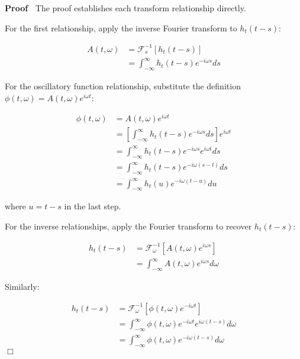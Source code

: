 \documentclass{article}
\newenvironment{proof}{\noindent\textbf{Proof\ }}{\hspace*{\fill}$\Box$\medskip}
\begin{document}
\begin{proof}
  The proof establishes each transform relationship directly.
  
  For the first relationship, apply the inverse Fourier transform to $h_t  (t
  - s)$:
  
  \begin{align}
    A (t, \omega) & =\mathcal{F}_s^{- 1}  [h_t (t - s)] \\
    & = \int_{- \infty}^{\infty} h_t  (t - s) e^{- i \omega s} ds 
  \end{align}
  
  For the oscillatory function relationship, substitute the definition $\phi
  (t, \omega) = A (t, \omega) e^{i \omega t}$:
  
  \begin{align}
    \phi (t, \omega) & = A (t, \omega) e^{i \omega t} \\
    & = \left[ \int_{- \infty}^{\infty} h_t (t - s) e^{- i \omega s} ds
    \right] e^{i \omega t} \\
    & = \int_{- \infty}^{\infty} h_t  (t - s) e^{- i \omega s} e^{i \omega t}
    ds \\
    & = \int_{- \infty}^{\infty} h_t  (t - s) e^{- i \omega (s - t)} ds \\
    & = \int_{- \infty}^{\infty} h_t (u) e^{- i \omega (t - u)} du 
  \end{align}
  
  where $u = t - s$ in the last step.
  
  For the inverse relationships, apply the Fourier transform to recover $h_t 
  (t - s)$:
  
  \begin{align}
    h_t  (t - s) & =\mathcal{F}_{\omega}^{- 1}  [A (t, \omega) e^{i \omega s}]
    \\
    & = \int_{- \infty}^{\infty} A (t, \omega) e^{i \omega s} d \omega 
  \end{align}
  
  Similarly:
  
  \begin{align}
    h_t  (t - s) & =\mathcal{F}_{\omega}^{- 1}  [\phi (t, \omega) e^{- i
    \omega t}] \\
    & = \int_{- \infty}^{\infty} \phi (t, \omega) e^{- i \omega t} e^{i
    \omega (t - s)} d \omega \\
    & = \int_{- \infty}^{\infty} \phi (t, \omega) e^{- i \omega (t - s)} d
    \omega 
  \end{align}
\end{proof}
\end{document}
